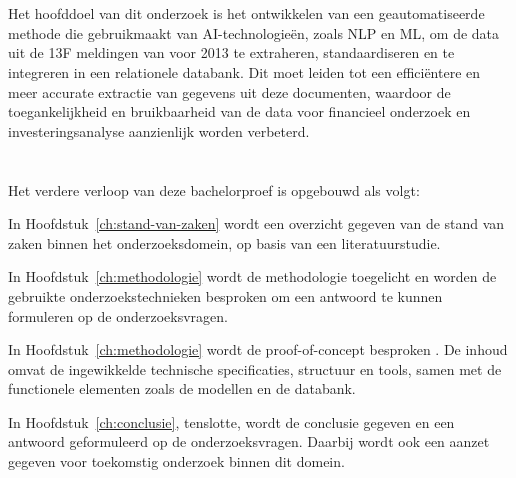 \section{}%
\label{sec:onderzoeksdoelstelling}

Het hoofddoel van dit onderzoek is het ontwikkelen van een geautomatiseerde methode die gebruikmaakt van AI-technologieën, zoals NLP en ML, om de data uit de 13F meldingen van voor 2013 te extraheren, standaardiseren en te integreren in een relationele databank. Dit moet leiden tot een efficiëntere en meer accurate extractie van gegevens uit deze documenten, waardoor de toegankelijkheid en bruikbaarheid van de data voor financieel onderzoek en investeringsanalyse aanzienlijk worden verbeterd. 


\section{}%
\label{sec:opzet-bachelorproef}


Het verdere verloop van deze bachelorproef is opgebouwd als volgt:

In Hoofdstuk~\ref{ch:stand-van-zaken} wordt een overzicht gegeven van de stand van zaken binnen het onderzoeksdomein, op basis van een literatuurstudie.

In Hoofdstuk~\ref{ch:methodologie} wordt de methodologie toegelicht en worden de gebruikte onderzoekstechnieken besproken om een antwoord te kunnen formuleren op de onderzoeksvragen.

In Hoofdstuk~\ref{ch:methodologie}  wordt de proof-of-concept besproken . De inhoud omvat de ingewikkelde technische specificaties, structuur en tools, samen met de functionele elementen zoals de modellen en de databank.


In Hoofdstuk~\ref{ch:conclusie}, tenslotte, wordt de conclusie gegeven en een antwoord geformuleerd op de onderzoeksvragen. Daarbij wordt ook een aanzet gegeven voor toekomstig onderzoek binnen dit domein.